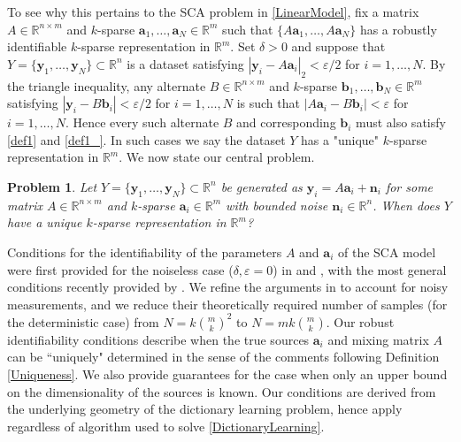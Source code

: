 \documentclass[journal, onecolumn]{IEEEtran}
\newtheorem{problem}{Problem}
\begin{document}
To see why this pertains to the SCA problem in \eqref{LinearModel}, fix a matrix $A \in \mathbb{R}^{n \times m}$ and $k$-sparse $\mathbf{a}_1, \ldots, \mathbf{a}_N \in \mathbb{R}^m$ such that $\{A\mathbf{a}_1, \ldots, A\mathbf{a}_N\}$ has a robustly identifiable $k$-sparse representation in $\mathbb{R}^m$. Set $\delta > 0$ and suppose that $Y = \{\mathbf{y}_1, \ldots, \mathbf{y}_N\} \subset \mathbb{R}^n$ is a dataset satisfying $|\mathbf{y}_i - A\mathbf{a}_i|_2 < \varepsilon/2$ for $i = 1, \ldots, N$. By the triangle inequality, any alternate $B \in \mathbb{R}^{n \times m}$ and $k$-sparse $\mathbf{b}_1, \ldots, \mathbf{b}_N \in \mathbb{R}^m$ satisfying $|\mathbf{y}_i - B\mathbf{b}_i| < \varepsilon/2$ for $i = 1, \ldots, N$ is such that $|A\mathbf{a}_i - B\mathbf{b}_i| < \varepsilon$ for $i = 1, \ldots, N$. Hence every such alternate $B$ and corresponding $\mathbf{b}_i$ must also satisfy \eqref{def1} and \eqref{def1_}. In such cases we say the dataset $Y$ has a "unique" $k$-sparse representation in $\mathbb{R}^m$. We now state our central problem.

\begin{problem}\label{DUTproblem}
Let $Y = \{\mathbf{y}_1, \ldots, \mathbf{y}_N \} \subset \mathbb{R}^n$ be generated as $\mathbf{y}_i = A\mathbf{a}_i  + \mathbf{n}_i$ for some matrix $A \in \mathbb{R}^{n \times m}$ and $k$-sparse $\mathbf{a}_i \in \mathbb{R}^m$ with bounded noise $\mathbf{n}_i \in \mathbb{R}^n$. When does $Y$ have a unique $k$-sparse representation in $\mathbb{R}^m$?
\end{problem}

Conditions for the identifiability of the parameters $A$ and $\mathbf{a}_i$ of the SCA model were first provided for the noiseless case ($\delta,\varepsilon = 0$) in \cite{Georgiev05} and \cite{Aharon06}, with the most general conditions recently provided by \cite{Hillar15}.
We refine the arguments in \cite{Hillar15} to account for noisy measurements, and we reduce their theoretically required number of samples (for the deterministic case) from $N=k{m \choose k}^2$ to $N = mk{m \choose k}$.  Our robust identifiability conditions describe when the true sources $\mathbf{a}_i$ and mixing matrix $A$ can be ``uniquely" determined in the sense of the comments following Definition \ref{Uniqueness}. We also provide guarantees for the case when only an upper bound on the dimensionality of the sources is known. Our conditions are derived from the underlying geometry of the dictionary learning problem, hence apply regardless of algorithm used to solve \eqref{DictionaryLearning}. 
\end{document}
